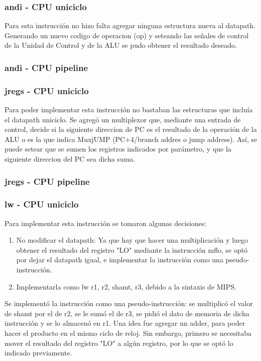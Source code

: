 \documentclass[a4paper, 12pt]{article}
\begin{document}
	\subsubsection{andi - CPU uniciclo}
	Para esta instrucción no hizo falta agregar ninguna estructura nueva al datapath. Generando un nuevo codigo de operacion (op) y seteando las señales de control de la Unidad de Control y de la ALU  se pudo obtener el resultado deseado.
	
	\subsubsection{andi - CPU pipeline}
	
	\subsubsection{jregs - CPU uniciclo}
	Para poder implementar esta instrucción no bastaban las estructuras que incluía el datapath uniciclo.
	Se agregó un multiplexor que, mediante una entrada de control, decide si la siguiente direccion de PC es el resultado de la operación de la ALU o es la que indica MuxjUMP (PC+4/branch addres o jump address). Así, se puede setear que se sumen los registros indicados por parámetro, y que la siguiente direccion del PC sea dicha suma.
	\subsubsection{jregs - CPU pipeline}
	
	\subsubsection{lw - CPU uniciclo}
	Para implementar esta instrucción se tomaron algunas decisiones:
	\begin{enumerate}
	\item No modificar el datapath: Ya que hay que hacer una multiplicación y luego obtener el resultado del registro "LO" mediante la instrucción mflo, se optó por dejar el datapath igual, e implementar la instrucción como una pseudo-instrucción.
	\item Implementarla como lw r1, r2, shamt, r3, debido a la sintaxis de MIPS.
	\end{enumerate}
	Se implementó la instrucción como una pseudo-instrucción: se multiplicó el valor de shamt por el de r2, se le sumó el de r3, se pidió el dato de memoria de dicha instrucción y se lo almacenó en r1.
	Una idea fue agregar un adder, para poder hacer el producto en el mismo ciclo de reloj. Sin embargo, primero se necesitaba mover el resultado del registro "LO" a algún registro, por lo que se optó lo indicado previamente.
	
\end{document}

